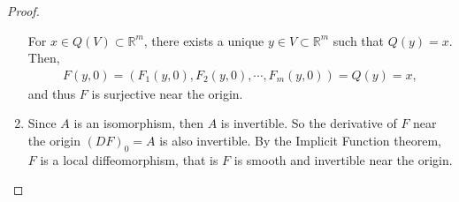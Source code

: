 \documentclass[11pt]{article}
\theoremstyle{definition}
\numberwithin{equation}{subsection}
\begin{document}
\begin{proof}
\begin{enumerate}[label=(\alph*)]
    For $x\in Q(V) \subset \mathbb{R}^m$, there exists a unique $y \in V \subset \mathbb{R}^m$ such that $Q(y) = x$. Then, 
    \begin{align*}
        F(y,0) = \left(F_1(y,0), F_2(y,0), \cdots, F_m(y,0) \right) = Q(y) = x,
    \end{align*}
    and thus $F$ is surjective near the origin.
    
    \item Since $A$ is an isomorphism, then $A$ is invertible. So the derivative of $F$ near the origin $(DF)_0 = A$ is also invertible. By the Implicit Function theorem, $F$ is a local diffeomorphism, that is $F$ is smooth and invertible near the origin.
\end{enumerate}
\end{proof}

\medskip
\end{document}
